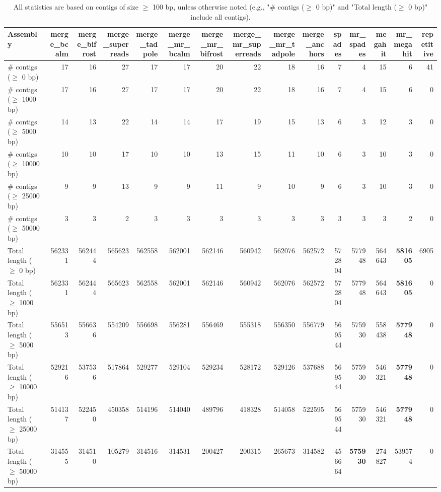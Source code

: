 \documentclass[12pt,a4paper]{article}
\begin{document}
\begin{table}[ht]
\begin{center}
\caption{All statistics are based on contigs of size $\geq$ 100 bp, unless otherwise noted (e.g., "\# contigs ($\geq$ 0 bp)" and "Total length ($\geq$ 0 bp)" include all contigs).}
\begin{tabular}{|l*{14}{|r}|}
\hline
Assembly & merge\_bcalm & merge\_bifrost & merge\_superreads & merge\_tadpole & merge\_mr\_bcalm & merge\_mr\_bifrost & merge\_mr\_superreads & merge\_mr\_tadpole & merge\_anchors & spades & mr\_spades & megahit & mr\_megahit & repetitive \\ \hline
\# contigs ($\geq$ 0 bp) & 17 & 16 & 27 & 17 & 17 & 20 & 22 & 18 & 16 & 7 & 4 & 15 & 6 & 41 \\ \hline
\# contigs ($\geq$ 1000 bp) & 17 & 16 & 27 & 17 & 17 & 20 & 22 & 18 & 16 & 7 & 4 & 15 & 6 & 0 \\ \hline
\# contigs ($\geq$ 5000 bp) & 14 & 13 & 22 & 14 & 14 & 17 & 19 & 15 & 13 & 6 & 3 & 12 & 3 & 0 \\ \hline
\# contigs ($\geq$ 10000 bp) & 10 & 10 & 17 & 10 & 10 & 13 & 15 & 11 & 10 & 6 & 3 & 10 & 3 & 0 \\ \hline
\# contigs ($\geq$ 25000 bp) & 9 & 9 & 13 & 9 & 9 & 11 & 9 & 10 & 9 & 6 & 3 & 10 & 3 & 0 \\ \hline
\# contigs ($\geq$ 50000 bp) & 3 & 3 & 2 & 3 & 3 & 3 & 3 & 3 & 3 & 3 & 3 & 3 & 2 & 0 \\ \hline
Total length ($\geq$ 0 bp) & 562331 & 562444 & 565623 & 562558 & 562001 & 562146 & 560942 & 562076 & 562572 & 572804 & 577948 & 564643 & {\bf 581605} & 6905 \\ \hline
Total length ($\geq$ 1000 bp) & 562331 & 562444 & 565623 & 562558 & 562001 & 562146 & 560942 & 562076 & 562572 & 572804 & 577948 & 564643 & {\bf 581605} & 0 \\ \hline
Total length ($\geq$ 5000 bp) & 556513 & 556636 & 554209 & 556698 & 556281 & 556469 & 555318 & 556350 & 556779 & 569544 & 575930 & 558438 & {\bf 577948} & 0 \\ \hline
Total length ($\geq$ 10000 bp) & 529216 & 537536 & 517864 & 529277 & 529104 & 529234 & 528172 & 529126 & 537688 & 569544 & 575930 & 546321 & {\bf 577948} & 0 \\ \hline
Total length ($\geq$ 25000 bp) & 514137 & 522450 & 450358 & 514196 & 514040 & 489796 & 418328 & 514058 & 522595 & 569544 & 575930 & 546321 & {\bf 577948} & 0 \\ \hline
Total length ($\geq$ 50000 bp) & 314555 & 314510 & 105279 & 314516 & 314531 & 200427 & 200315 & 265673 & 314582 & 456664 & {\bf 575930} & 274827 & 539574 & 0 \\ \hline

\end{tabular}
\end{center}
\end{table}
\end{document}

